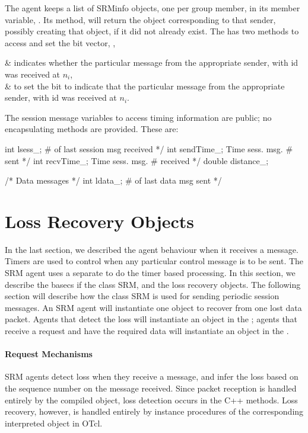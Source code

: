 {The agent keeps a list of SRMinfo objects, one per group member,
in its member variable, .
Its method, 
will return the object corresponding to that sender,
possibly creating that object, if it did not already exist.
The  has two methods
to access and set the bit vector, \ie,
\begin{alist}
 & indicates whether the particular message
                from the appropriate sender, with id 
                 was received at $n_i$,\\
 & to set the bit to indicate that the
                particular message from the appropriate sender,
                with id  was received at $n_i$.
\end{alist}
The session message variables to access timing information are public;
no encapsulating methods are provided.  These are:
\begin{program}
        int     lsess_;                   \* # of last session msg received */
        int     sendTime_;                \* Time sess. msg. # sent */
        int     recvTime_;                \* Time sess. msg. # received */
        double  distance_;

        /* {\cf Data messages} */
        int     ldata_;                   \* # of last data msg sent */
\end{program}

\section{Loss Recovery Objects}
\label{sec:recovery}

In the last section,
we described the agent behaviour when it receives a message.
Timers are used to control when any particular control message is to be sent.
The SRM agent uses a separate
to do the timer based processing.
In this section, we describe the basecs if the class SRM,
and the loss recovery objects.
The following section will describe how the class SRM is used 
for sending periodic session messages.
An SRM agent will instantiate one object to recover from one lost data packet.
Agents that detect the loss will instantiate an object in the
;
agents that receive a request and have the required data will
instantiate an object in the .

\paragraph{Request Mechanisms}
SRM agents detect loss when they receive a message, and
infer the loss based on the sequence number on the message received.
Since packet reception is handled entirely by the compiled object,
loss detection occurs in the C++ methods.
Loss recovery, however, is handled entirely by instance procedures
of the corresponding interpreted object in OTcl.

}
